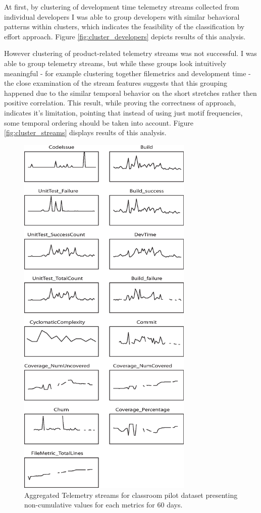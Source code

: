 \documentclass{sig-alternate}
\begin{document}
At first, by clustering of development time telemetry streams collected from individual developers I was able to group developers with similar behavioral patterns within clusters, which indicates the feasibility of the classification by effort approach. Figure \ref{fig:cluster_developers} depicts results of this analysis.

However clustering of product-related telemetry streams was not successful. I was able to group telemetry streams, but while these groups look intuitively meaningful - for example clustering together filemetrics and development time - the close examination of the stream features suggests that this grouping happened due to the similar temporal behavior on the short stretches rather then positive correlation. This result, while proving the correctness of approach, indicates it's limitation, pointing that instead of using just motif frequencies, some temporal ordering should be taken into account. Figure \ref{fig:cluster_streams} displays results of this analysis.

\begin{figure}[tp]
   \centering
   \includegraphics[height=180mm]{telemetry_streams.eps}
   \caption{Aggregated Telemetry streams for classroom pilot dataset presenting non-cumulative values for each metrics for 60 days. \\ \\ \\ \\ \\ \\ \\ }
   \label{fig:streams}
\end{figure}
\end{document}
